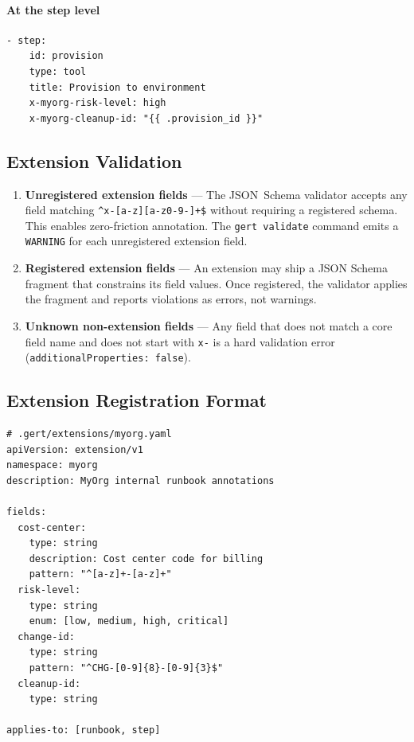 \paragraph{At the step level}

\begin{verbatim}
- step:
    id: provision
    type: tool
    title: Provision to environment
    x-myorg-risk-level: high
    x-myorg-cleanup-id: "{{ .provision_id }}"
\end{verbatim}

\subsection{Extension Validation}

\begin{enumerate}
  \item \textbf{Unregistered extension fields} — The JSON~Schema validator
        accepts any field matching \texttt{\^{}x-[a-z][a-z0-9-]+\$} without
        requiring a registered schema.  This enables zero-friction annotation.
        The \texttt{gert validate} command emits a \texttt{WARNING} for each
        unregistered extension field.
  \item \textbf{Registered extension fields} — An extension may ship a JSON
        Schema fragment that constrains its field values.  Once registered, the
        validator applies the fragment and reports violations as errors, not
        warnings.
  \item \textbf{Unknown non-extension fields} — Any field that does not match
        a core field name and does not start with \texttt{x-} is a hard
        validation error (\texttt{additionalProperties: false}).
\end{enumerate}

\subsection{Extension Registration Format}

\begin{verbatim}
# .gert/extensions/myorg.yaml
apiVersion: extension/v1
namespace: myorg
description: MyOrg internal runbook annotations

fields:
  cost-center:
    type: string
    description: Cost center code for billing
    pattern: "^[a-z]+-[a-z]+"
  risk-level:
    type: string
    enum: [low, medium, high, critical]
  change-id:
    type: string
    pattern: "^CHG-[0-9]{8}-[0-9]{3}$"
  cleanup-id:
    type: string

applies-to: [runbook, step]
\end{verbatim}

